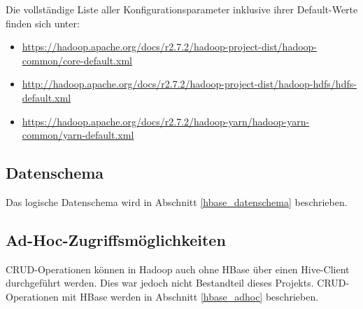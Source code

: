 Die vollständige Liste aller Konfigurationsparameter inklusive ihrer Default-Werte finden sich unter:

\begin{itemize}
	\item \url{https://hadoop.apache.org/docs/r2.7.2/hadoop-project-dist/hadoop-common/core-default.xml}
	\item \url{http://hadoop.apache.org/docs/r2.7.2/hadoop-project-dist/hadoop-hdfs/hdfs-default.xml}
	\item \url{https://hadoop.apache.org/docs/r2.7.2/hadoop-yarn/hadoop-yarn-common/yarn-default.xml}
\end{itemize}

\subsection{Datenschema}
Das logische Datenschema wird in Abschnitt \ref{hbase_datenschema}  beschrieben.

\subsection{Ad-Hoc-Zugriffsmöglichkeiten}
CRUD-Operationen können in Hadoop auch ohne HBase über einen Hive-Client durchgeführt werden. Dies war jedoch nicht Bestandteil dieses Projekts. CRUD-Operationen mit HBase werden in Abschnitt \ref{hbase_adhoc} beschrieben.
